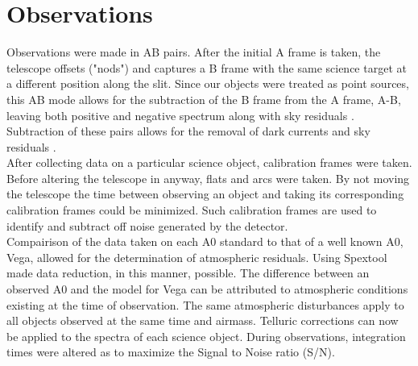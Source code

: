 \section{Observations}


Observations were made in AB pairs.  After the initial A frame is taken, the telescope offsets ("nods") and captures a B frame with the same science target at a different position along the slit.  Since our objects were treated as point sources, this AB mode allows for the subtraction of the B frame from the A frame, A-B, leaving both positive and negative spectrum along with sky residuals \cite{Cushing_2004}. Subtraction of these pairs allows for the removal of dark currents and sky residuals \cite{Joyce_1992}.\\


After collecting data on a particular science object, calibration frames were taken.  Before altering the telescope in anyway, flats and arcs were taken.  By not moving the telescope the time between observing an object and taking its corresponding calibration frames could be minimized.  Such calibration frames are used to identify and subtract off noise generated by the detector.\\



Compairison of the data taken on each A0 standard to that of a well known A0, Vega, allowed for the determination of atmospheric residuals.  Using Spextool made data reduction, in this manner, possible.  The difference between an observed A0 and the model for Vega can be attributed to atmospheric conditions existing at the time of observation.  The same atmospheric disturbances apply to all objects observed at the same time and airmass.  Telluric corrections can now be applied to the spectra of each science object.  During observations, integration times were altered as to maximize the Signal to Noise ratio (S/N). \cite{Cushing_2004}\\


